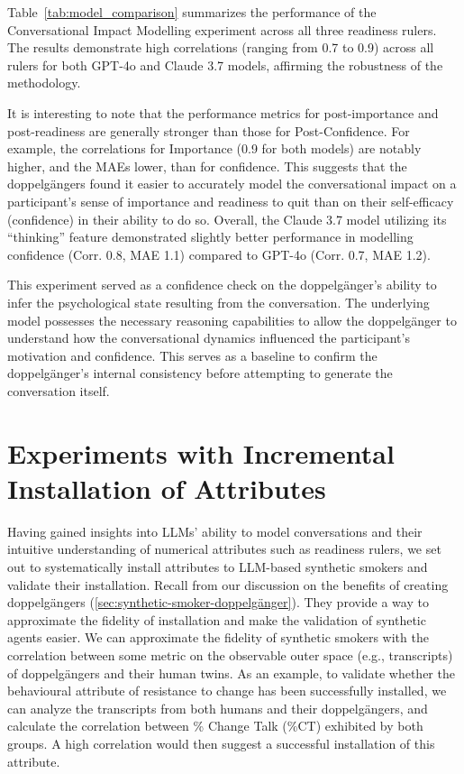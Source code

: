 Table~\ref{tab:model_comparison} summarizes the performance of the Conversational Impact Modelling experiment across all three readiness rulers. The results demonstrate high correlations (ranging from 0.7 to 0.9) across all rulers for both GPT-4o and Claude 3.7 models, affirming the robustness of the methodology.

It is interesting to note that the performance metrics for post-importance and post-readiness are generally stronger than those for Post-Confidence. For example, the correlations for Importance (0.9 for both models) are notably higher, and the MAEs lower, than for confidence. This suggests that the doppelgängers found it easier to accurately model the conversational impact on a participant's sense of importance and readiness to quit than on their self-efficacy (confidence) in their ability to do so. Overall, the Claude 3.7 model utilizing its ``thinking'' feature demonstrated slightly better performance in modelling confidence (Corr. 0.8, MAE 1.1) compared to GPT-4o (Corr. 0.7, MAE 1.2).



This experiment served as a confidence check on the doppelgänger's ability to infer the psychological state resulting from the conversation. The underlying model possesses the necessary reasoning capabilities to allow the doppelgänger to understand how the conversational dynamics influenced the participant's motivation and confidence. This serves as a baseline to confirm the doppelgänger's internal consistency before attempting to generate the conversation itself.



\section{Experiments with Incremental Installation of Attributes}
Having gained insights into LLMs' ability to model conversations and their intuitive understanding of numerical attributes such as readiness rulers, we set out to systematically install attributes to LLM-based synthetic smokers and validate their installation. Recall from our discussion on the benefits of creating doppelgängers (\cref{sec:synthetic-smoker-doppelgänger}). They provide a way to approximate the fidelity of installation and make the validation of synthetic agents easier. We can approximate the fidelity of synthetic smokers with the correlation between some metric on the observable outer space (e.g., transcripts) of doppelgängers and their human twins. As an example, to validate whether the behavioural attribute of resistance to change has been successfully installed, we can analyze the transcripts from both humans and their doppelgängers, and calculate the correlation between \% Change Talk (\%CT) exhibited by both groups. A high correlation would then suggest a successful installation of this attribute.


